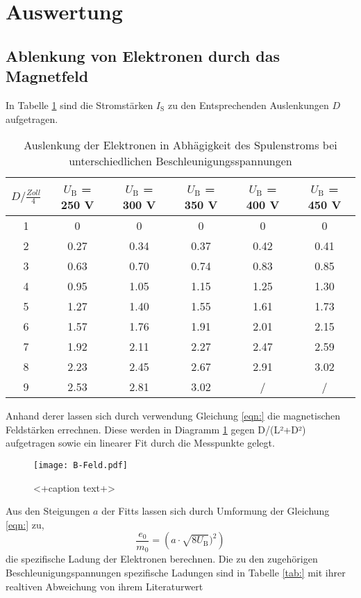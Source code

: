 \section{Auswertung}
\label{sec:Auswertung}
\subsection{Ablenkung von Elektronen durch das Magnetfeld}
In Tabelle \ref{tab:DIS} sind die Stromstärken $I_\text{S}$ zu den Entsprechenden Auslenkungen $D$ aufgetragen.
\begin{table}
  \centering
  \begin{tabular}{c| c c c c c }
    \toprule
    $D / \frac{Zoll}{4}$ & $U_\text{B}$ = 250 V & $U_\text{B}$ = 300 V & $U_\text{B}$ = 350 V & $U_\text{B}$ = 400 V & $U_\text{B}$ = 450 V \\
    \midrule
    1 &	0	&0	&0	&0	&0	\\
    2 &	0.27	&0.34	&0.37	&0.42	&0.41	\\
    3 &	0.63	&0.70	&0.74	&0.83	&0.85	\\
    4 &	0.95	&1.05	&1.15	&1.25	&1.30	\\	
    5 &	1.27	&1.40	&1.55	&1.61	&1.73	\\
    6 &	1.57	&1.76	&1.91	&2.01	&2.15	\\
    7 &	1.92	&2.11 	&2.27	&2.47	&2.59	\\
    8 &	2.23	&2.45	&2.67	&2.91	&3.02	\\
    9 &	2.53	&2.81	&3.02	&/	&/	\\
    \bottomrule
  \end{tabular}
  \caption{Auslenkung der Elektronen in Abhägigkeit des Spulenstroms bei unterschiedlichen Beschleunigungsspannungen}
  \label{tab:DIS}
\end{table}
Anhand derer lassen sich durch verwendung Gleichung \eqref{eqn:} die magnetischen Feldstärken errechnen. Diese werden in Diagramm \ref{fig:bfeld} gegen D/(L²+D²) aufgetragen sowie ein linearer Fit durch die Messpunkte gelegt. 
\begin{figure}
  \centering
  \texttt{[image: B-Feld.pdf]}
  \caption{<+caption text+>}
  \label{fig:bfeld}
\end{figure}
Aus den Steigungen $a$ der Fitts lassen sich durch Umformung der Gleichung \eqref{eqn:} zu,
\begin{equation}
  \frac{e_0}{m_0} = \left( a \cdot \sqrt{8 U_\text{B}} )^2 \right)
  \label{eqn:e0m0}
\end{equation}
die spezifische Ladung der Elektronen berechnen. Die zu den zugehörigen Beschleunigungspannungen spezifische Ladungen sind in Tabelle \ref{tab:} mit ihrer realtiven Abweichung von ihrem Literaturwert %

